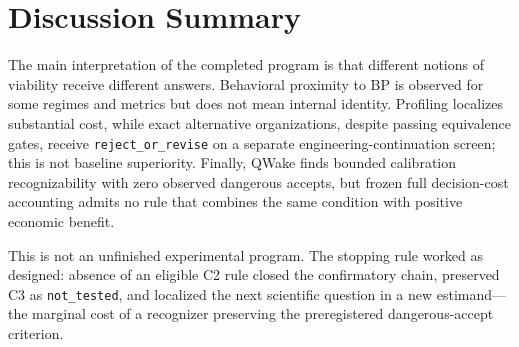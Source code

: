 \section{Discussion Summary}

The main interpretation of the completed program is that different notions of
viability receive different answers. Behavioral proximity to BP is observed for some
regimes and metrics but does not mean internal identity. Profiling localizes
substantial cost, while exact alternative organizations, despite passing equivalence
gates, receive \texttt{reject\_or\_revise} on a separate engineering-continuation
screen; this is not baseline superiority. Finally, QWake finds bounded calibration
recognizability with zero observed dangerous accepts, but frozen full decision-cost
accounting admits no rule that combines the same condition with positive economic
benefit.

This is not an unfinished experimental program. The stopping rule worked as designed:
absence of an eligible C2 rule closed the confirmatory chain, preserved C3 as
\texttt{not\_tested}, and localized the next scientific question in a new estimand---
the marginal cost of a recognizer preserving the preregistered dangerous-accept
criterion.
